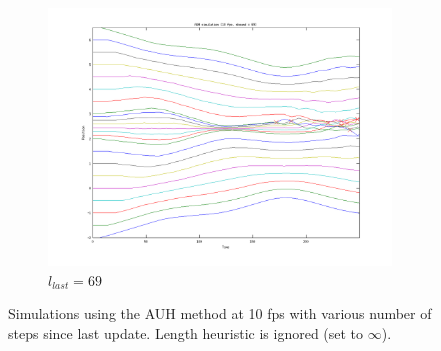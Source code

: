 \documentclass[11pt]{article}
\begin{document}
\begin{figure}[H]
\begin{subfigure}{0.3\textwidth}
        \includegraphics[width=\textwidth]{../images/atomic_multiscale_10fps_69sbound.png}
        \caption{$l_{last} = 69$}
        \label{fig:atomic_multi_69sbound}
    \end{subfigure}
    \caption{Simulations using the AUH method at 10 fps with various number of
    steps since last update. Length heuristic is ignored (set to $\infty$).}
    \label{fig:atomic_multi_sbound}
\end{figure}
\end{document}
